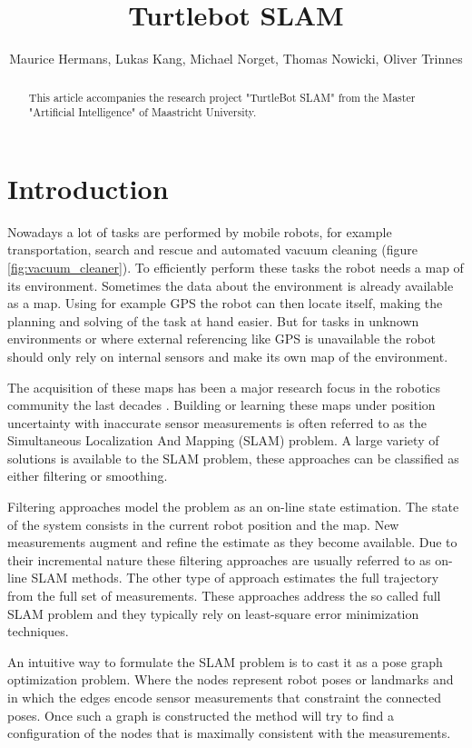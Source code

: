 \documentclass{ba-kecs}
\title{Turtlebot SLAM }
\author{Maurice Hermans, Lukas Kang, Michael Norget, Thomas Nowicki, Oliver Trinnes}
\begin{document}
\maketitle

\begin{abstract}
This article accompanies the research project "TurtleBot SLAM" from the Master "Artificial Intelligence" of Maastricht University.
\end{abstract}

\section{Introduction}
Nowadays a lot of tasks are performed by mobile robots, for example transportation, search and rescue and automated vacuum cleaning (figure \ref{fig:vacuum_cleaner}). To efficiently perform these tasks the robot needs a map of its environment. Sometimes the data about the environment is already available as a map. Using for example GPS the robot can then locate itself, making the planning and solving of the task at hand easier. But for tasks in unknown environments or where external referencing  like GPS is unavailable the robot should only rely on internal sensors and make its own map of the environment.

The acquisition of these maps has been a major research focus in the robotics community the last decades \cite{Grisetti}. Building or learning these maps under position uncertainty with inaccurate sensor measurements is often referred to as the Simultaneous Localization And Mapping (SLAM) problem. A large variety of solutions is available to the SLAM problem, these approaches can be classified as either filtering or smoothing.

Filtering approaches model the problem as an on-line state estimation. The state of the system consists in the current robot position and the map. New measurements augment and refine the estimate as they become available. Due to their incremental nature these filtering approaches are usually referred to as on-line SLAM methods. The other type of approach estimates the full trajectory from the full set of measurements. These approaches address the so called full SLAM problem and they typically rely on least-square error minimization techniques.

An intuitive way to formulate the SLAM problem is to cast it as a pose graph optimization problem. Where the nodes represent robot poses or landmarks and in which the edges encode sensor measurements that constraint the connected poses. Once such a graph is constructed the method will try to find a configuration of the nodes that is maximally consistent with the measurements.
\end{document}
